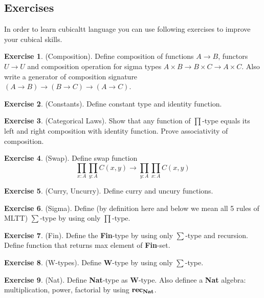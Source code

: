 \documentclass[twoside]{article}
\theoremstyle{definition}
\newtheorem{exercise}{Exercise}
\begin{document}
\subsection{Exercises}

In order to learn cubicaltt language you can use
following exercises to improve your cubical skills.

\begin{exercise} (Composition). Define composition of functions $A \rightarrow B$,
functors $U \rightarrow U$ and composition operation for sigma types
$A \times B \rightarrow B \times C \rightarrow A \times C$. Also write a generator
of composition signature $(A \rightarrow B) \rightarrow (B \rightarrow C) \rightarrow (A \rightarrow C)$.
\end{exercise}

\begin{exercise} (Constants). Define constant type and identity function.
\end{exercise}

\begin{exercise} (Categorical Laws).
Show that any function of $\prod$-type equals its left and right composition with identity function.
Prove associativity of composition.
\end{exercise}

\begin{exercise} (Swap). Define swap function
$$
    \prod_{x:A}\prod_{y:A}C(x,y) \rightarrow \prod_{y:A}\prod_{x:A}C(x,y)
$$
\end{exercise}

\begin{exercise} (Curry, Uncurry). Define curry and uncury functions.
\end{exercise}

\begin{exercise} (Sigma). Define (by definition here and below we mean all 5 rules of MLTT)
$\sum$-type by using only $\prod$-type.
\end{exercise}

\begin{exercise} (Fin). Define the {\bf Fin}-type by using only $\sum$-type and recursion.
Define function that returns max element of {\bf Fin}-set.
\end{exercise}

\begin{exercise} (W-types). Define 
{\bf W}-type by using only $\sum$-type.
\end{exercise}

\begin{exercise} (Nat). Define {\bf Nat}-type as {\bf W}-type. Also definee a {\bf Nat}
algebra: multiplication, power, factorial by using ${\bf rec_{Nat}}$.
\end{exercise}
\end{document}
